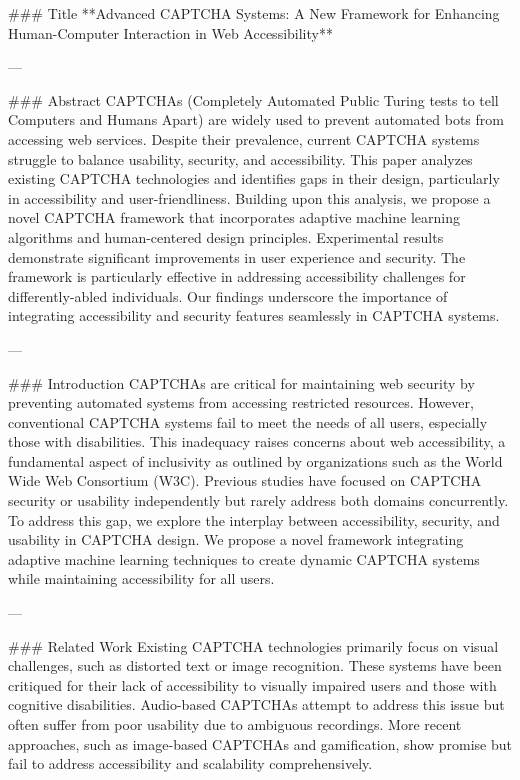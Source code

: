 ### Title  
**Advanced CAPTCHA Systems: A New Framework for Enhancing Human-Computer Interaction in Web Accessibility**

---

### Abstract  
CAPTCHAs (Completely Automated Public Turing tests to tell Computers and Humans Apart) are widely used to prevent automated bots from accessing web services. Despite their prevalence, current CAPTCHA systems struggle to balance usability, security, and accessibility. This paper analyzes existing CAPTCHA technologies and identifies gaps in their design, particularly in accessibility and user-friendliness. Building upon this analysis, we propose a novel CAPTCHA framework that incorporates adaptive machine learning algorithms and human-centered design principles. Experimental results demonstrate significant improvements in user experience and security. The framework is particularly effective in addressing accessibility challenges for differently-abled individuals. Our findings underscore the importance of integrating accessibility and security features seamlessly in CAPTCHA systems.

---

### Introduction  
CAPTCHAs are critical for maintaining web security by preventing automated systems from accessing restricted resources. However, conventional CAPTCHA systems fail to meet the needs of all users, especially those with disabilities. This inadequacy raises concerns about web accessibility, a fundamental aspect of inclusivity as outlined by organizations such as the World Wide Web Consortium (W3C). Previous studies have focused on CAPTCHA security or usability independently but rarely address both domains concurrently. To address this gap, we explore the interplay between accessibility, security, and usability in CAPTCHA design. We propose a novel framework integrating adaptive machine learning techniques to create dynamic CAPTCHA systems while maintaining accessibility for all users.

---

### Related Work  
Existing CAPTCHA technologies primarily focus on visual challenges, such as distorted text or image recognition. These systems have been critiqued for their lack of accessibility to visually impaired users and those with cognitive disabilities. Audio-based CAPTCHAs attempt to address this issue but often suffer from poor usability due to ambiguous recordings. More recent approaches, such as image-based CAPTCHAs and gamification, show promise but fail to address accessibility and scalability comprehensively.

